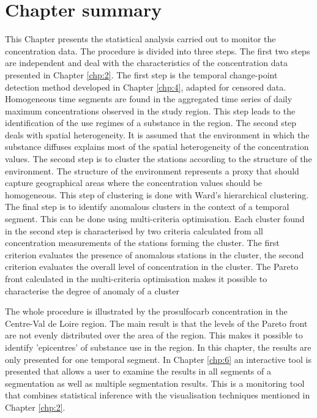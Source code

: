 \clearpage

\section{Chapter summary}

This Chapter presents the statistical analysis carried out to monitor the concentration data. The procedure is divided into three steps. The first two steps are independent and deal with the characteristics of the concentration data presented in Chapter \ref{chp:2}. The first step is the temporal change-point detection method developed in Chapter \ref{chp:4}, adapted for censored data. Homogeneous time segments are found in the aggregated time series of daily maximum concentrations observed in the study region. This step leads to the identification of the use regimes of a substance in the region. The second step deals with spatial heterogeneity. It is assumed that the environment in which the substance diffuses explains most of the spatial heterogeneity of the concentration values. The second step is to cluster the stations according to the structure of the environment. The structure of the environment represents a proxy that should capture geographical areas where the concentration values should be homogeneous. This step of clustering is done with Ward's hierarchical clustering. The final step is to identify anomalous clusters in the context of a temporal segment. This can be done using multi-criteria optimisation. Each cluster found in the second step is characterised by two criteria calculated from all concentration measurements of the stations forming the cluster. The first criterion evaluates the presence of anomalous stations in the cluster, the second criterion evaluates the overall level of concentration in the cluster. The Pareto front calculated in the multi-criteria optimisation makes it possible to characterise the degree of anomaly of a cluster 

The whole procedure is illustrated by the prosulfocarb concentration in the Centre-Val de Loire region. The main result is that the levels of the Pareto front are not evenly distributed over the area of the region. This makes it possible to identify 'epicentres' of substance use in the region. In this chapter, the results are only presented for one temporal segment. In Chapter \ref{chp:6} an interactive tool is presented that allows a user to examine the results in all segments of a segmentation as well as multiple segmentation results. This is a monitoring tool that combines statistical inference with the visualisation techniques mentioned in Chapter \ref{chp:2}.